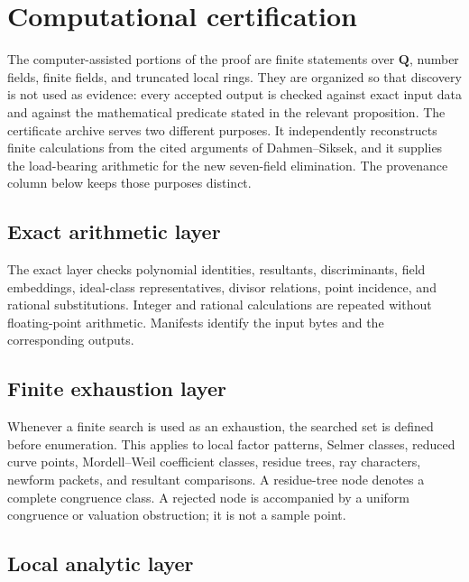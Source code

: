 \documentclass[11pt]{article}
\newcommand{\Q}{\mathbf Q}
\theoremstyle{definition}
\theoremstyle{remark}
\begin{document}
\section{Computational certification}

The computer-assisted portions of the proof are finite statements over
$\Q$, number fields, finite fields, and truncated local rings.  They are
organized so that discovery is not used as evidence: every accepted output
is checked against exact input data and against the mathematical predicate
stated in the relevant proposition.  The certificate archive serves two
different purposes.  It independently reconstructs finite calculations from
the cited arguments of Dahmen--Siksek, and it supplies the load-bearing arithmetic
for the new seven-field elimination.  The provenance column below keeps
those purposes distinct.

\subsection{Exact arithmetic layer}

The exact layer checks polynomial identities, resultants, discriminants,
field embeddings, ideal-class representatives, divisor relations, point
incidence, and rational substitutions.  Integer and rational calculations
are repeated without floating-point arithmetic.  Manifests identify the
input bytes and the corresponding outputs.

\subsection{Finite exhaustion layer}

Whenever a finite search is used as an exhaustion, the searched set is
defined before enumeration.  This applies to local factor patterns, Selmer
classes, reduced curve points, Mordell--Weil coefficient classes, residue
trees, ray characters, newform packets, and resultant comparisons.  A
residue-tree node denotes a complete congruence class.  A rejected node is
accompanied by a uniform congruence or valuation obstruction; it is not a
sample point.

\subsection{Local analytic layer}
\end{document}
